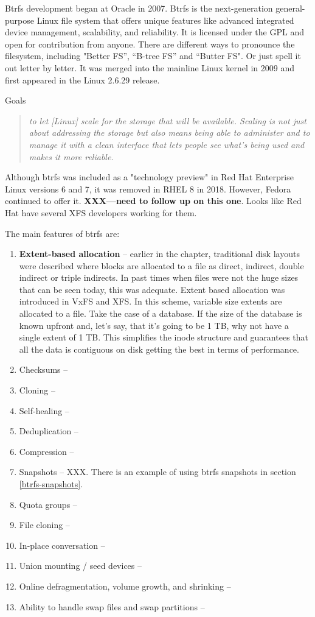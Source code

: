 
Btrfs development began at Oracle in 2007. Btrfs is the next-generation general-purpose Linux file system that offers unique features like advanced integrated device management, scalability, and reliability. It is licensed under the GPL and open for contribution from anyone. There are different ways to pronounce the filesystem, including "Better FS”, “B-tree FS” and “Butter FS". Or just spell it out letter by letter. It was merged into the mainline Linux kernel in 2009 and first appeared in the Linux 2.6.29 release.

Goals

\begin{quote}
\textit{to let [Linux] scale for the storage that will be available. Scaling is not just about addressing the storage but also means being able to administer and to manage it with a clean interface that lets people see what's being used and makes it more reliable.}
\end{quote}

Although btrfs was included as a "technology preview" in Red Hat Enterprise Linux versions 6 and 7, it was removed in RHEL 8 in 2018. However, Fedora continued to offer it. \textbf{XXX---need to follow up on this one}. Looks like Red Hat have several XFS developers working for them.

The main features of btrfs are:

\begin{enumerate}
	\item \textbf{Extent-based allocation} -- earlier in the chapter, traditional disk layouts were described where blocks 
		are allocated to a file as direct, indirect, double indirect or triple indirects. In past times when files were not the 
		huge sizes that can be seen today, this was adequate. Extent based allocation was introduced in VxFS and XFS.
		In this scheme, variable size extents are allocated to a file. Take the case of a database. If the size of the database
		is known upfront and, let's say, that it's going to be 1 TB, why not have a single extent of 1 TB. This simplifies the
		inode structure and guarantees that all the data is contiguous on disk getting the best in terms of performance.
	\item Checksums -- 
	\item Cloning -- 
	\item Self-healing -- 
	\item Deduplication -- 
	\item Compression -- 
	\item Snapshots -- XXX. There is an example of using btrfs snapshots in section \ref{btrfs-snapshots}.
	\item Quota groups --
	\item File cloning -- 
	\item In-place conversation --
	\item Union mounting / seed devices -- 
	\item Online defragmentation, volume growth, and shrinking -- 
	\item Ability to handle swap files and swap partitions --
\end{enumerate}

